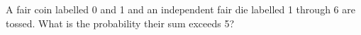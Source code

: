 A fair coin labelled 0 and 1 and an independent fair die labelled 1 through 6 are tossed. What is the probability their sum exceeds 5?
